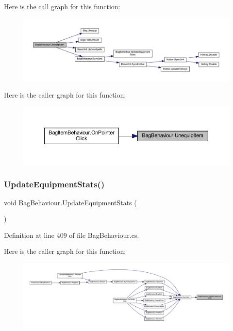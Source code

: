 Here is the call graph for this function\+:
\nopagebreak
\begin{figure}[H]
\begin{center}
\leavevmode
\includegraphics[width=350pt]{class_bag_behaviour_a61062b91187139c43e2681c220111433_cgraph}
\end{center}
\end{figure}
Here is the caller graph for this function\+:
\nopagebreak
\begin{figure}[H]
\begin{center}
\leavevmode
\includegraphics[width=350pt]{class_bag_behaviour_a61062b91187139c43e2681c220111433_icgraph}
\end{center}
\end{figure}
\mbox{\label{class_bag_behaviour_ad2e50a51bbb8f9c90a3241dbce0f87c0}} 
\subsubsection{\texorpdfstring{UpdateEquipmentStats()}{UpdateEquipmentStats()}}
{\footnotesize\ttfamily void Bag\+Behaviour.\+Update\+Equipment\+Stats (\begin{DoxyParamCaption}{ }\end{DoxyParamCaption})}



Definition at line 409 of file Bag\+Behaviour.\+cs.

Here is the caller graph for this function\+:
\nopagebreak
\begin{figure}[H]
\begin{center}
\leavevmode
\includegraphics[width=350pt]{class_bag_behaviour_ad2e50a51bbb8f9c90a3241dbce0f87c0_icgraph}
\end{center}
\end{figure}


